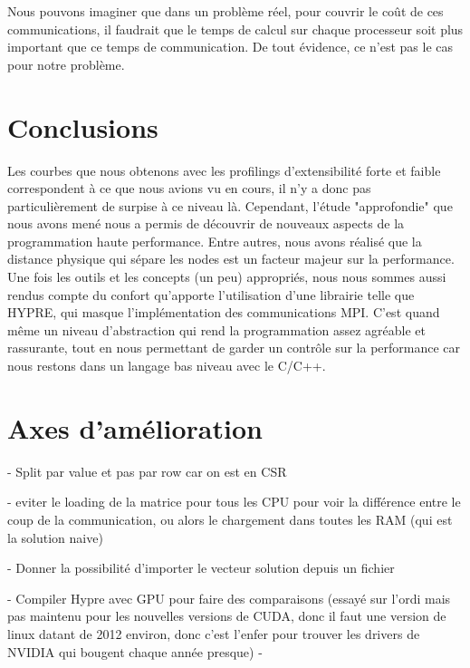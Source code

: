 \documentclass[10pt,twocolumn,letterpaper]{article}
\begin{document}

Nous pouvons imaginer que dans un problème réel, pour couvrir le coût de ces
communications, il faudrait que le temps de calcul sur chaque processeur
soit plus important que ce temps de communication. De tout évidence, ce n'est
pas le cas pour notre problème.

\section*{Conclusions}

Les courbes que nous obtenons avec les profilings d'extensibilité forte et
faible correspondent à ce que nous avions vu en cours, il n'y a donc pas
particulièrement de surpise à ce niveau là. Cependant, l'étude "approfondie"
que nous avons mené nous a permis de découvrir de nouveaux aspects de la
programmation haute performance. Entre autres, nous avons réalisé que la
distance physique qui sépare les nodes est un facteur majeur sur la performance.
Une fois les outils et les concepts (un peu) appropriés, nous nous sommes aussi
rendus compte du confort qu'apporte l'utilisation
d'une librairie telle que HYPRE,
qui masque l'implémentation des communications MPI. C'est quand même un niveau
d'abstraction qui rend la programmation assez agréable et rassurante, tout en
nous permettant de garder un contrôle sur la performance
car nous restons dans un langage bas niveau avec le C/C++.

\section*{Axes d'amélioration}
- Split par value et pas par row car on est en CSR

- eviter le loading de la matrice pour tous les CPU pour voir la
différence entre le coup de la communication, ou alors le chargement dans 
toutes les RAM (qui est la solution naive)

- Donner la possibilité d'importer le vecteur solution depuis un fichier

- Compiler Hypre avec GPU pour faire des comparaisons (essayé sur l'ordi mais 
pas maintenu pour les nouvelles versions de CUDA, donc il faut une version de
linux datant de 2012 environ, donc c'est l'enfer pour trouver les drivers de NVIDIA
qui bougent chaque année presque)
-

\end{document}
